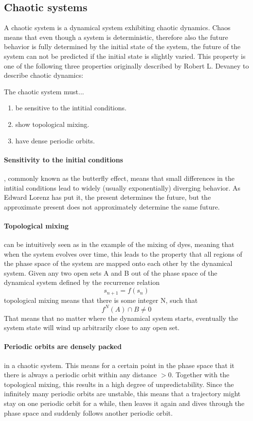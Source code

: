 \documentclass[main]{subfiles}
\begin{document}
\subsection{Chaotic systems}

A chaotic system is a dynamical system exhibiting chaotic dynamics. Chaos means that even though a system is deterministic, therefore also the future behavior is fully determined by the initial state of the system, the future of the system can not be predicted if the initial state is slightly varied. This property is one of the following three properties originally described by Robert L. Devaney to describe chaotic dynamics:

The chaotic system must...
\begin{enumerate}
\item be sensitive to the intitial conditions.
\item show topological mixing.
\item have dense periodic orbits.
\end{enumerate}

\paragraph{Sensitivity to the initial conditions}, commonly known as the butterfly effect, means that small differences in the intitial conditions lead to widely (usually exponentially) diverging behavior. As Edward Lorenz has put it, the present determines the future, but the approximate present does not approximately determine the same future.

\paragraph{Topological mixing} can be intuitively seen as in the example of the mixing of dyes, meaning that when the system evolves over time, this leads to the property that all regions of the phase space of the system are mapped onto each other by the dynamical system. Given any two open sets A and B out of the phase space of the dynamical system defined by the recurrence relation \[s_{n+1} = f(s_n)\] topological mixing means that there is some integer N, such that \[f^N(A) \cap B \neq 0\] That means that no matter where the dynamical system starts, eventually the system state will wind up arbitrarily close to any open set.

\paragraph{Periodic orbits are densely packed} in a chaotic system. This means for a certain point in the phase space that it there is always a periodic orbit within any distance \(> 0\). Together with the topological mixing, this results in a high degree of unpredictability. Since the infinitely many periodic orbits are unstable, this means that a trajectory might stay on one periodic orbit for a while, then leaves it again and dives through the phase space and suddenly follows another periodic orbit.
\end{document}
